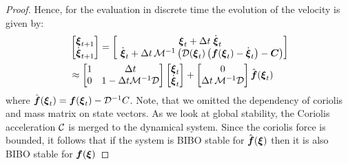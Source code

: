 \begin{proof}
Hence, for the evaluation in discrete time the evolution of the velocity is given by:
\begin{equation}
	\begin{split}
	& \begin{bmatrix}
	 \vecs \xi_{t+1} \\ \dot{\vecs \xi}_{t+1}
	\end{bmatrix}
	=
	\begin{bmatrix}
		\vect \xi_t + \Delta t  \; \dot{\vect \xi}_t \\ \
		\dot{\vecs \xi}_t + \Delta t \, \matd{M}^{-1} \left( \matd{D}(\vect \xi_t) \left( \vect f(\vecs \xi_t) - \dot{\vecs \xi}_t \right) - \matr C \right)
	\end{bmatrix} \\
	&  \approx
	\begin{bmatrix}
		1 & \Delta t \\
		0 & 1 - \Delta t \matd{M}^{-1} \matd D 
	\end{bmatrix}
	\begin{bmatrix}
		\vect \xi_t \\ \dot{\vect \xi}_t
	\end{bmatrix}
	+ \begin{bmatrix}
		0 \\ 
		\Delta t \, \matd{M}^{-1} \matd{D} 
	\end{bmatrix}
	\hat{\vect f}(\vecs \xi_t) 
	\label{eq:discrete_time_proof}
	\end{split}
\end{equation}
where $\hat{\boldsymbol{f}}(\boldsymbol{\xi}_t) = \boldsymbol{f}(\boldsymbol{\xi}_t) - \mathcal{D}^{-1} C$. Note, that we omitted the dependency of coriolis and mass matrix on state vectors.
As we look at global stability, the Coriolis acceleration $\mathcal{C}$ is merged to the dynamical system. Since the coriolis force is bounded, it follows that if the system is BIBO stable for $\hat{\boldsymbol{f}}(\boldsymbol{\xi})$ then it is also BIBO stable for $\boldsymbol{f}(\boldsymbol{\xi})$ 



\end{proof}
